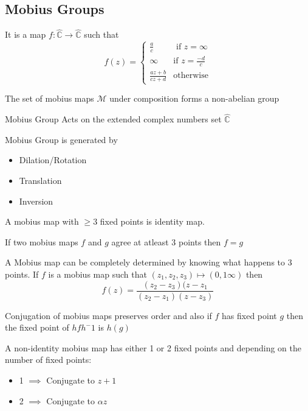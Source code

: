 \documentclass[11pt]{scrartcl}
\begin{document}
\subsection{Mobius Groups}
\begin{definitions}
It is a map $f: \hat{\mathbb{C}} \rightarrow \hat{\mathbb{C}} $ such that 
\[
  f(z) =
  \begin{cases}
                                 \frac{a}{c} & \text{ if $z=\infty$} \\
  \infty & \text{if $z=\frac{-d}{c}$} \\
                      \frac{az+b}{cz+d} & \text{otherwise} 
  \end{cases}
\]
\end{definitions}
\begin{definitions}
The set of mobius maps $\mathcal{M}$ under composition forms a non-abelian group
\end{definitions}
\begin{prop}
Mobius Group Acts on the extended complex numbers set $\hat{\mathbb{C}}$
\end{prop}
\begin{prop}
Mobius Group is generated by 
\begin{itemize}
    \item Dilation/Rotation
    \item Translation
    \item Inversion
\end{itemize}
\end{prop}
\begin{prop}
A mobius map with $\geq 3$ fixed points is identity map.
\end{prop}
\begin{prop}
If two mobius maps $f$ and $g$ agree at atleast 3 points then $f=g$
\end{prop}
\begin{prop}
A Mobius map can be completely determined by knowing what happens to 3 points. If $f$ is a mobius map such that $(z_1,z_2,z_3) \mapsto (0,1 \infty)$ then 
$$f(z)=\frac{(z_2-z_3)(z-z_1}{(z_2-z_1)(z-z_3)}$$
\end{prop}
\begin{prop}
Conjugation of mobius maps preserves order and also if $f$ has fixed point $g$ then the fixed point of $hfh^-1$ is $h(g)$
\end{prop}
\begin{prop}
A non-identity mobius map has either 1 or 2 fixed points and depending on the number of fixed points:
\begin{itemize}
    \item 1 $\implies$ Conjugate to $z+1$
    \item 2 $\implies$ Conjugate to $\alpha z$
\end{itemize}
\end{prop}
\end{document}
